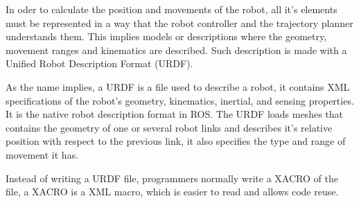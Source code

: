 In oder to calculate the position and movements of the robot, all it's elements must be  represented in a way that the robot controller and the trajectory planner understands them. This implies models or descriptions where the geometry, movement ranges and kinematics are described. Such description is made with a Unified Robot Description Format (URDF).

As the name implies, a URDF is a file used to describe a robot, it contains XML specifications of the robot's geometry, kinematics, inertial, and sensing properties. It is the native robot description format in ROS. The URDF loads meshes that contains the geometry of one or several robot links and describes it's relative position with respect to the previous link, it also specifies the type and range of movement it has.

Instead of writing a URDF file, programmers normally write a XACRO of the file, a XACRO is a XML macro, which is easier to read and allows code reuse. 